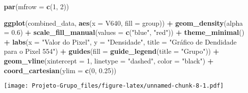 \documentclass[
]{article}
\newenvironment{Shaded}{\begin{snugshade}}{\end{snugshade}}
\newcommand{\AttributeTok}[1]{\textcolor[rgb]{0.13,0.29,0.53}{#1}}
\newcommand{\DecValTok}[1]{\textcolor[rgb]{0.00,0.00,0.81}{#1}}
\newcommand{\FloatTok}[1]{\textcolor[rgb]{0.00,0.00,0.81}{#1}}
\newcommand{\FunctionTok}[1]{\textcolor[rgb]{0.13,0.29,0.53}{\textbf{#1}}}
\newcommand{\NormalTok}[1]{#1}
\newcommand{\SpecialCharTok}[1]{\textcolor[rgb]{0.81,0.36,0.00}{\textbf{#1}}}
\newcommand{\StringTok}[1]{\textcolor[rgb]{0.31,0.60,0.02}{#1}}
\begin{document}
\begin{Shaded}
\begin{Highlighting}[]
\FunctionTok{par}\NormalTok{(}\AttributeTok{mfrow =} \FunctionTok{c}\NormalTok{(}\DecValTok{1}\NormalTok{, }\DecValTok{2}\NormalTok{))}

\FunctionTok{ggplot}\NormalTok{(combined\_data, }\FunctionTok{aes}\NormalTok{(}\AttributeTok{x =}\NormalTok{ V640, }\AttributeTok{fill =}\NormalTok{ group)) }\SpecialCharTok{+}
  \FunctionTok{geom\_density}\NormalTok{(}\AttributeTok{alpha =} \FloatTok{0.6}\NormalTok{) }\SpecialCharTok{+}
  \FunctionTok{scale\_fill\_manual}\NormalTok{(}\AttributeTok{values =} \FunctionTok{c}\NormalTok{(}\StringTok{"blue"}\NormalTok{, }\StringTok{"red"}\NormalTok{)) }\SpecialCharTok{+}
  \FunctionTok{theme\_minimal}\NormalTok{() }\SpecialCharTok{+}
  \FunctionTok{labs}\NormalTok{(}\AttributeTok{x =} \StringTok{"Valor do Pixel"}\NormalTok{, }\AttributeTok{y =} \StringTok{"Densidade"}\NormalTok{, }\AttributeTok{title =} \StringTok{"Gráfico de Dendidade para o Pixel 554"}\NormalTok{) }\SpecialCharTok{+}
  \FunctionTok{guides}\NormalTok{(}\AttributeTok{fill =} \FunctionTok{guide\_legend}\NormalTok{(}\AttributeTok{title =} \StringTok{"Grupo"}\NormalTok{)) }\SpecialCharTok{+} 
  \FunctionTok{geom\_vline}\NormalTok{(}\AttributeTok{xintercept =} \DecValTok{1}\NormalTok{, }\AttributeTok{linetype =} \StringTok{"dashed"}\NormalTok{, }\AttributeTok{color =} \StringTok{"black"}\NormalTok{) }\SpecialCharTok{+}
  \FunctionTok{coord\_cartesian}\NormalTok{(}\AttributeTok{ylim =} \FunctionTok{c}\NormalTok{(}\DecValTok{0}\NormalTok{, }\FloatTok{0.25}\NormalTok{))}
\end{Highlighting}
\end{Shaded}

\texttt{[image: Projeto-Grupo\_files/figure-latex/unnamed-chunk-8-1.pdf]}
\end{document}
